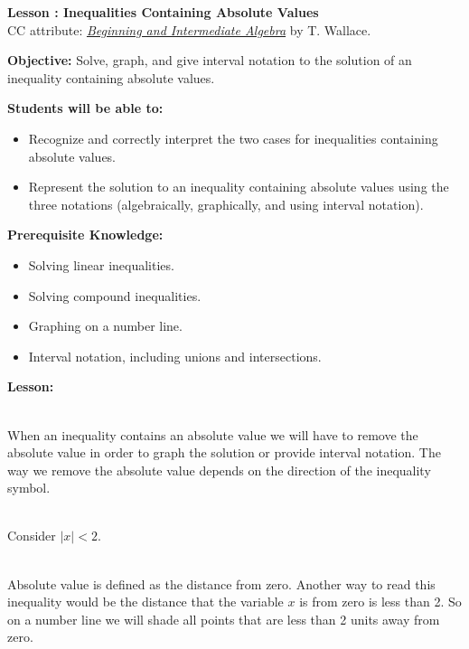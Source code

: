 \documentclass[12pt]{article}
\theoremstyle{definition}
\begin{document}
{\bf \large Lesson : Inequalities Containing Absolute Values}
\\ CC attribute: \href{http://www.wallace.ccfaculty.org/book/book.html}{\it{Beginning and Intermediate Algebra}} by T. Wallace. 
\hfill \doclicenseImage[imagewidth=5em]\\
\par
{\bf Objective:} Solve, graph, and give interval notation to the solution of an inequality containing absolute values.\\
\par
{\bf Students will be able to:}
\begin{itemize}
	\item Recognize and correctly interpret the two cases for inequalities containing absolute values.
	\item Represent the solution to an inequality containing absolute values using the three notations (algebraically, graphically, and using interval notation).
\end{itemize}
{\bf Prerequisite Knowledge:}
\begin{itemize}
	\item Solving linear inequalities.
	\item Solving compound inequalities.
	\item Graphing on a number line.
	\item Interval notation, including unions and intersections.
\end{itemize}
\hrulefill

{\bf Lesson:}\\
\ \par
When an inequality contains an absolute value we will have to remove the absolute value in order to graph the solution or provide interval notation. The way we remove the absolute value depends on the direction of the inequality symbol.\\
\ \par
Consider $|x| < 2$.\\
\ \par
Absolute value is defined as the distance from zero. Another way to read this inequality would be the distance that the variable $x$ is from zero is less than 2. So on a number line we will shade all points that are less than 2 units away from zero.
\begin{center}
\end{center}
\end{document}
